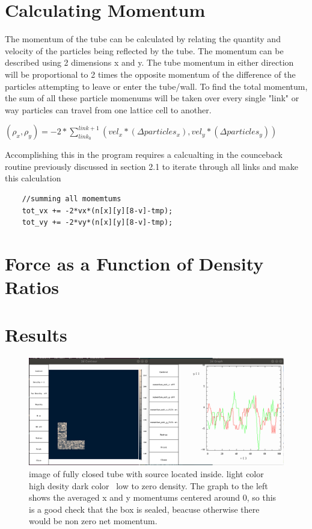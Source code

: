 \documentclass{article}
\begin{document}
\section{Calculating Momentum}
 The momentum of the tube can be calculated by relating  the quantity and velocity of the particles being reflected by the tube. The momentum can be described using 2 dimensions x and y. The tube momentum in either direction will be proportional to 2 times the opposite momentum of the difference of the particles attempting to leave or enter the tube/wall. To find the total momentum, the sum of all these particle momenums will be taken over every single "link" or way particles can travel from one lattice cell to another.
 
\vspace{5mm}
$
(\rho_x,\rho_y) = -2*\sum_{link_0}^{link+1} (vel_x*(\Delta particles_x),vel_y*(\Delta particles_y))
 $
\vspace{5mm}

 Accomplishing this in the program requires a calcualting in the counceback routine previously discussed in section 2.1 to iterate through all links and make this calculation
 
 \begin{verbatim}
    //summing all momemtums
    tot_vx += -2*vx*(n[x][y][8-v]-tmp);
    tot_vy += -2*vy*(n[x][y][8-v]-tmp);
\end{verbatim}
 
\section{Force as a Function of Density Ratios}

\section{Results}

\begin{figure}[H]
\centering
\includegraphics[scale=0.3]{p1_noleakage.png}
\caption{\label{fig} image of fully closed tube with source located inside. light color ~ high desity dark color ~low to zero density. The graph to the left shows the averaged x and y momentums centered around 0, so this is a good check that the box is sealed, beacuse otherwise there would be non zero net momentum.}
\end{figure}
\end{document}
